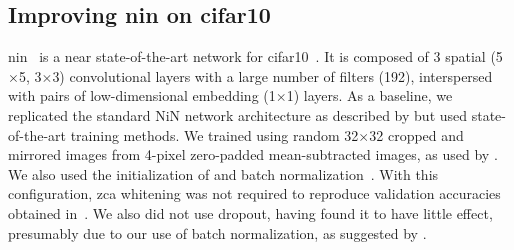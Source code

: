\documentclass[thesis]{subfiles}
\begin{document}
	\subsection{Improving \Gls{nin} on \Gls{cifar10}}
	\Gls{nin}~\citep{Lin2013NiN} is a near state-of-the-art network for \gls{cifar10}~\citep{CIFAR10}. It is composed of 3 spatial (5$\times$5, 3$\times$3) convolutional layers with a large number of filters (192), interspersed with pairs of low-dimensional embedding (1$\times$1) layers. As a baseline, we replicated the standard NiN network architecture as described by \citet{Lin2013NiN} but used state-of-the-art training methods. We trained using random 32$\times$32 cropped and mirrored images from 4-pixel zero-padded  mean-subtracted images, as used by \citet{goodfellow2013maxout, He2015}. We also used the initialization of \citet{He2015b} and batch normalization~\citep{Ioffe2015}. With this configuration, \gls{zca} whitening was not required to reproduce validation accuracies obtained in~\citep{Lin2013NiN}. We also did not use dropout, having found it to have little effect, presumably due to our use of batch normalization, as suggested by \citet{Ioffe2015}.
	
\end{document}
